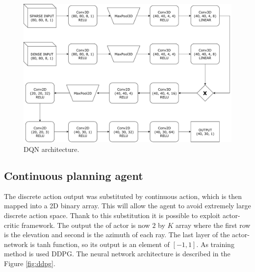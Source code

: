\clearpage
\begin{figure}[!h]
\centering
\includegraphics[scale=0.6]{fig/dql.pdf}
\caption{DQN architecture.}
\label{fig:dqn}
\end{figure}

\clearpage
\subsection{Continuous planning agent}
The discrete action output was substituted by continuous action, which is then mapped into a 2D binary array. This will allow the agent to avoid extremely large discrete action space. Thank to this substitution it is possible to exploit actor-critic framework. The output the of actor is now $2$ by $K$ array where the first row is the elevation and second is the azimuth of each ray. The last layer of the actor-network is tanh function, so its output is an element of $[-1, 1]$. As training method is used DDPG. The neural network architecture is described in the Figure \ref{fig:ddpg}.

